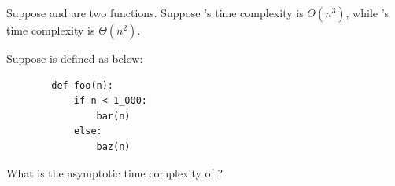 \begin{prob}
    Suppose  and  are two functions.
    Suppose 's time complexity is $\Theta(n^3)$, while 's
    time complexity is $\Theta(n^2)$.

    Suppose  is defined as below:

    \begin{verbatim}
        def foo(n):
            if n < 1_000:
                bar(n)
            else:
                baz(n)
    \end{verbatim}

    What is the asymptotic time complexity of ?

\end{prob}
